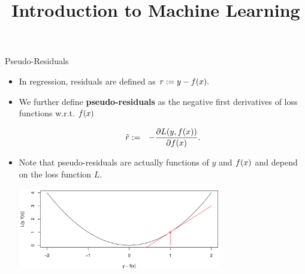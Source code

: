 




\newcommand{\titlefigure}{figure_man/optimization_steps.jpeg}
\newcommand{\learninggoals}{
\item Know the concept of pseudo-residuals 
\item Understand the relationship between pseudo-residuals and gradient descent 
}

\title{Introduction to Machine Learning}
\date{}






\begin{vbframe}{Pseudo-Residuals}

\begin{itemize}
	\item In regression, residuals are defined as $
			r := y - f(x).$
\item We further define \textbf{pseudo-residuals} as the negative first derivatives of loss functions w.r.t. $f(x)$

\vspace*{-0.3cm}
  \begin{eqnarray*}
    \tilde r &:=& - \frac{\partial \Lxy}{\partial \fx}.  %
  \end{eqnarray*}
\item Note that pseudo-residuals are actually functions of $y$ and $f(x)$ and depend on the loss function $L$. %

\includegraphics[width=0.7\textwidth]{figure_man/loss.png}

\end{itemize}

\end{vbframe}

